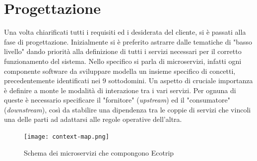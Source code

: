 
\section{Progettazione}
Una volta chiarificati tutti i requisiti ed i desiderata del cliente, si è passati alla fase di progettazione. Inizialmente si è preferito astrarre dalle tematiche di "basso livello" dando priorità alla definizione di tutti i servizi necessari per il corretto funzionamento del sistema. Nello specifico si parla di microservizi, infatti ogni componente software da sviluppare modella un insieme specifico di concetti, precedentemente identificati nei 9 sottodomini. Un aspetto di cruciale importanza è definire a monte le modalità di interazione tra i vari servizi. Per ognuna di queste è necessario specificare il "fornitore" (\textit{upstream}) ed il "consumatore" (\textit{downstream}), così da stabilire una dipendenza tra le coppie di servizi che vincoli una delle parti ad adattarsi alle regole operative dell'altra.

\begin{figure}[H]
    \hspace*{-1.5cm}\texttt{[image: context-map.png]}
    \centering
    \caption[contextmap]{Schema dei microservizi che compongono Ecotrip}
    \label{fig:contextmap}
\end{figure}

